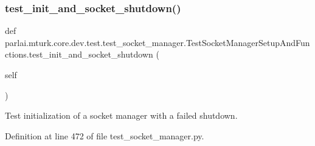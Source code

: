 \subsubsection{\texorpdfstring{test\+\_\+init\+\_\+and\+\_\+socket\+\_\+shutdown()}{test\_init\_and\_socket\_shutdown()}}
{\footnotesize\ttfamily def parlai.\+mturk.\+core.\+dev.\+test.\+test\+\_\+socket\+\_\+manager.\+Test\+Socket\+Manager\+Setup\+And\+Functions.\+test\+\_\+init\+\_\+and\+\_\+socket\+\_\+shutdown (\begin{DoxyParamCaption}\item[{}]{self }\end{DoxyParamCaption})}

\begin{DoxyVerb}Test initialization of a socket manager with a failed shutdown.
\end{DoxyVerb}
 

Definition at line 472 of file test\+\_\+socket\+\_\+manager.\+py.


